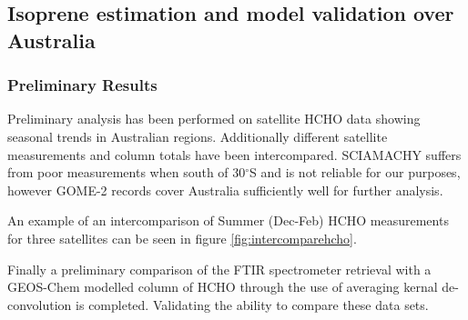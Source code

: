 \subsection{Isoprene estimation and model validation over Australia}

\subsubsection{Preliminary Results}

Preliminary analysis has been performed on satellite HCHO data showing seasonal trends in Australian regions.
Additionally different satellite measurements and column totals have been intercompared.
SCIAMACHY suffers from poor measurements when south of 30$^{\circ}$S and is not reliable for our purposes, however GOME-2 records cover Australia sufficiently well for further analysis. 

An example of an intercomparison of Summer (Dec-Feb) HCHO measurements for three satellites can be seen in figure \ref{fig:intercomparehcho}.

Finally a preliminary comparison of the FTIR spectrometer retrieval with a GEOS-Chem modelled column of HCHO through the use of averaging kernal de-convolution is completed.
Validating the ability to compare these data sets.